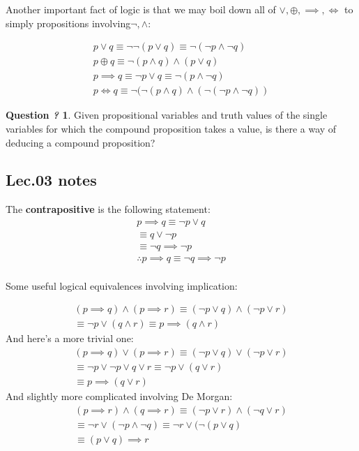 \documentclass[titlepage]{article}
\theoremstyle{definition}
\numberwithin{equation}{subsection}
\numberwithin{remark}{subsection}
\newtheorem{question}{Question \textit{?}}[subsection]
\begin{document}
Another important fact of logic is that we may boil down all of $\lor, \oplus, \implies, \iff$ to simply propositions involving$\neg, \land$: 

\begin{align*}
    p \lor q \equiv \neg \neg (p \lor q) \equiv \neg(\neg p \land \neg q)\\
    p \oplus q \equiv \neg(p \land q) \land (p \lor q)\\
    p \implies q \equiv \neg p \lor q \equiv \neg (p \land \neg q)\\
    p \iff q \equiv \neg(\neg(p\land q) \land (\neg (\neg p \land \neg q))
\end{align*}


\begin{question}
Given propositional variables and truth values of the single variables for which the compound proposition takes a value, is there a way of deducing a compound proposition? 
\end{question}
\newpage
\subsection{Lec.03 notes}

The \textbf{contrapositive} is the following statement:
\begin{align*}
    p \implies q \equiv \neg p \lor q\\
    \equiv q \lor \neg p\\
    \equiv \neg q \implies \neg p\\
    \therefore p \implies q \equiv \neg q \implies \neg p
\end{align*}
\\
Some useful logical equivalences involving implication:

\begin{align*}
    (p \implies q) \land (p \implies r) \equiv (\neg p \lor q) \land (\neg p \lor r)\\
    \equiv \neg p \lor (q \land r) \equiv p \implies (q \land r)
\end{align*}
And here's a more trivial one: 
\begin{align*}
    (p \implies q) \lor (p \implies r) \equiv (\neg p \lor q) \lor (\neg p \lor r)\\
    \equiv \neg p \lor \neg p \lor q \lor r \equiv \neg p \lor (q \lor r)\\
    \equiv p \implies (q \lor r)
\end{align*}
And slightly more complicated involving De Morgan:
\begin{align*}
    (p \implies r) \land (q \implies r) \equiv (\neg p \lor r) \land (\neg q \lor r)\\
    \equiv \neg r \lor (\neg p \land \neg q) \equiv \neg r \lor (\neg(p \lor q)\\
    \equiv (p \lor q) \implies r 
\end{align*}
\end{document}

